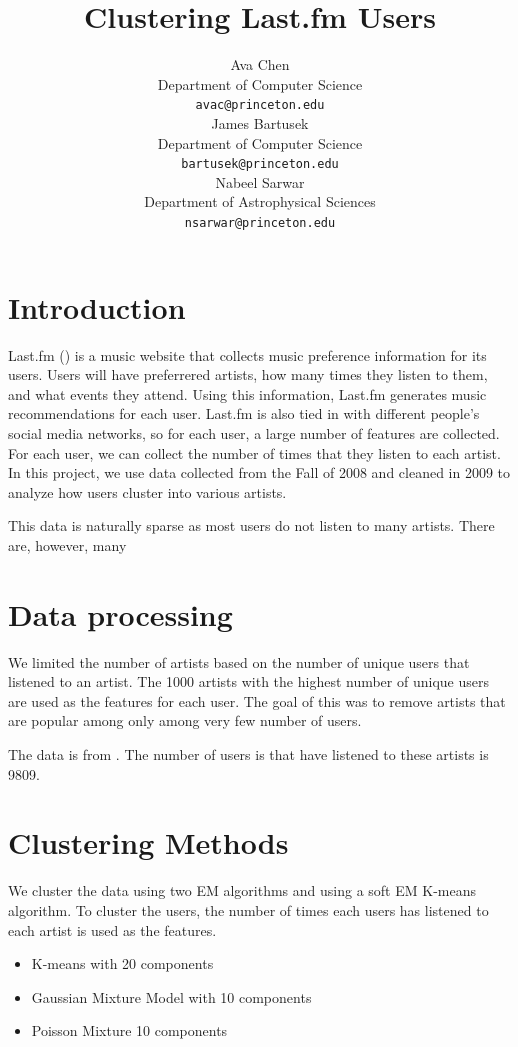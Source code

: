 \documentclass{article} %
\title{Clustering Last.fm Users}
\author{
Ava Chen\\
Department of Computer Science\\
\texttt{avac@princeton.edu}\\
\And
James Bartusek\\
Department of Computer Science\\
\texttt{bartusek@princeton.edu} \\
\And
Nabeel Sarwar\\
Department of Astrophysical Sciences\\
\texttt{nsarwar@princeton.edu} \\
}
\begin{document}
\maketitle

\begin{abstract}
\end{abstract}


\section{Introduction}

Last.fm (\cite{lastfm}) is a music website that collects music preference information for its users. Users will have preferrered artists, how many times they listen to them, and what events they attend. Using this information, Last.fm generates music recommendations for each user. Last.fm is also tied in with different people's social media networks, so for each user, a large number of features are collected. For each user, we can collect the number of times that they listen to each artist. In this project, we use data collected from the Fall of 2008 and cleaned in 2009 to analyze how users cluster into various artists.  

This data is naturally sparse as most users do not listen to many artists. There are, however, many 

\section{Data processing}

We limited the number of artists based on the number of unique users that listened to an artist. The 1000 artists with the highest number of unique users are used as the features for each user. The goal of this was to remove artists that are popular among only among very few number of users. 

The data is from \cite{data}. The number of users is that have listened to these artists is 9809. 


\section{Clustering Methods}


We cluster the data using two EM algorithms and using a soft EM K-means algorithm. To cluster the users, the number of times each users has listened to each artist is used as the features. 


\begin{itemize}
    \item K-means with 20 components
    \item Gaussian Mixture Model with 10 components
    \item Poisson Mixture 10 components
\end{itemize}
\end{document}
